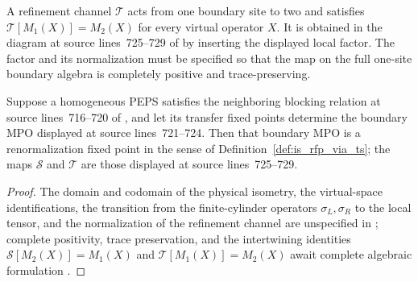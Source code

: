 \begin{definition}
    \label{def:peps_boundary_refinement}
    \notready
    A refinement channel $\mathcal T$ acts from one boundary site to two and
    satisfies $\mathcal T[M_1(X)]=M_2(X)$ for every virtual operator $X$. It
    is obtained in the diagram at source lines~725--729 of
    \cite{Cirac2016MPDO_arXiv} by inserting the displayed local factor. The
    factor and its normalization must be specified so that the map on the full
    one-site boundary algebra is completely positive and trace-preserving.
\end{definition}

\begin{lemma}
    \label{thm:peps_rfp_implies_boundary_rfp}
    \notready
    Suppose a homogeneous PEPS satisfies the neighboring blocking relation at
    source lines~716--720 of \cite{Cirac2016MPDO_arXiv}, and let its transfer
    fixed points determine the boundary MPO displayed at source lines~721--724.
    Then that boundary MPO is a renormalization fixed point in the sense of
    Definition~\ref{def:is_rfp_via_ts}; the maps $\mathcal S$ and $\mathcal T$
    are those displayed at source lines~725--729.
\end{lemma}

\begin{proof}
    \notready
    The domain and codomain of the physical isometry, the virtual-space
    identifications, the transition from the finite-cylinder operators
    $\sigma_L,\sigma_R$ to the local tensor, and the normalization of the
    refinement channel are unspecified in \cite{Cirac2016MPDO_arXiv}; complete
    positivity, trace preservation, and the intertwining identities
    $\mathcal S[M_2(X)]=M_1(X)$ and $\mathcal T[M_1(X)]=M_2(X)$ await complete
    algebraic formulation \cite{gap:cpsv16_peps_boundary_rfp_specification}.
\end{proof}
